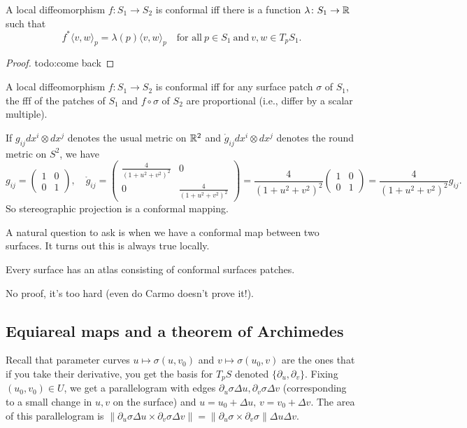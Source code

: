 \begin{theorem}
    A local diffeomorphism $f \colon S_1 \to S_2$ is conformal iff there is a function $\lambda \colon S_1 \to \mathbb{R}$ such that \[
        f^*\langle v,w \rangle _p=\lambda(p)\langle v,w \rangle _p \quad \text{for all} \ p \in S_1 \ \text{and} \ v,w \in T_p S_1.
    \] 
\end{theorem}
\begin{proof}
    {\color{red}todo:come back} 
\end{proof}
\begin{cor}
    A local diffeomorphism $f \colon S_1 \to S_2$ is conformal iff for any surface patch $\sigma$ of $S_1$, the fff of the patches of $S_1$ and $f \circ \sigma$ of $S_2$ are proportional (i.e., differ by a scalar multiple).
\end{cor}
\begin{example}
    If $g_{ij}dx^i \otimes dx^j $ denotes the usual metric on $\mathbb{R}^2$ and $\mathring g_{ij}dx^i \otimes dx^j $ denotes the round metric on $S^2$, we have \[
    g_{ij}=
    \begin{pmatrix}
        1 & 0 \\ 0 & 1
    \end{pmatrix},\quad \mathring g_{ij}=
    \begin{pmatrix}
        \frac{4}{(1+u^2+v^2)^2}   & 0 \\ 0 & \frac{4}{(1+u^2+v^2)^2}
    \end{pmatrix}=\frac{4}{(1+u^2+v^2)^2}
    \begin{pmatrix}
        1 & 0 \\ 0 & 1
    \end{pmatrix}=\frac{4}{(1+u^2+v^2)^2}g_{ij}.
    \] So stereographic projection is a conformal mapping.
\end{example}
A natural question to ask is when we have a conformal map between two surfaces. It turns out this is always true locally.
\begin{theorem}
    Every surface has an atlas consisting of conformal surfaces patches.
\end{theorem}
No proof, it's too hard (even do Carmo doesn't prove it!).

\subsection{Equiareal maps and a theorem of Archimedes}
Recall that parameter curves $u \mapsto \sigma(u,v_0)$ and $v \mapsto \sigma(u_0,v)$ are the ones that if you take their derivative, you get the basis for $T_p S$ denoted $\{\partial_u,\partial _v\} $. Fixing $(u_0,v_0) \in U$, we get a parallelogram with edges $\partial _u\sigma  \Delta u,\partial _v\sigma \Delta v$ (corresponding to a small change in $u,v$ on the surface) and $u=u_0+\Delta u,\, v=v_0+\Delta v$. The area of this parallelogram is $\|\partial _u\sigma \Delta u \times \partial _v\sigma \Delta v\|=\|\partial _u\sigma \times \partial _v\sigma\|\Delta u \Delta v$.

